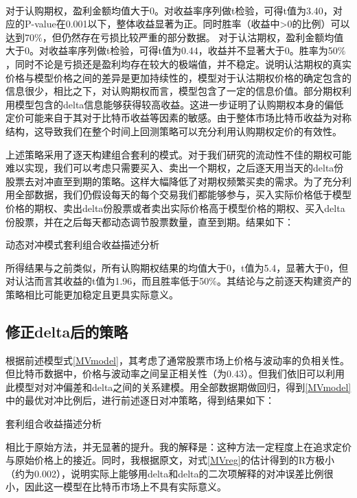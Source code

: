 ~\\ 
对于认购期权，盈利金额均值大于0。对收益率序列做t检验，可得t值为3.40，对应的P-value在0.001以下，整体收益显著为正。同时胜率（收益中>0的比例）可以达到70$\%$，但仍然存在亏损比较严重的部分数据。
对于认沽期权，盈利金额均值大于0。对收益率序列做t检验，可得t值为0.44，收益并不显著大于0。胜率为50$\%$，同时不论是亏损还是盈利均存在较大的极端值，并不稳定。说明认沽期权的真实价格与模型价格之间的差异是更加持续性的，模型对于认沽期权价格的确定包含的信息很少，相比之下，对认购期权而言，模型包含了一定的信息价值。部分期权利用模型包含的delta信息能够获得较高收益。这进一步证明了认购期权本身的偏低定价可能来自于其对于比特币收益等因素的敏感。由于整体市场比特币收益为对称结构，这导致我们在整个时间上回测策略可以充分利用认购期权定价的有效性。
\par{上述策略采用了逐天构建组合套利的模式。对于我们研究的流动性不佳的期权可能难以实现，我们可以考虑只需要买入、卖出一个期权，之后逐天用当天的delta份股票去对冲直至到期的策略。这样大幅降低了对期权频繁买卖的需求。为了充分利用全部数据，我们仍假设每天的每个交易我们都能够参与，买入实际价格低于模型价格的期权、卖出delta份股票或者卖出实际价格高于模型价格的期权、买入delta份股票，并在之后每天都动态调节股票数量，直至到期。结果如下：
}
\begin{table}[H]
    \caption{动态对冲模式套利组合收益描述分析}
    \centering
    

\end{table}
所得结果与之前类似，所有认购期权结果的均值大于0，t值为5.4，显著大于0，但对认沽而言其收益的t值为1.96，而且胜率低于50$\%$。其结论与之前逐天构建资产的策略相比可能更加稳定且更具实际意义。
\subsection{修正delta后的策略}
根据前述模型式\ref{MVmodel}，其考虑了通常股票市场上价格与波动率的负相关性。但比特币数据中，价格与波动率之间呈正相关性（为0.43）。但我们依旧可以利用此模型对对冲偏差和delta之间的关系建模。用全部数据期做回归，得到\ref{MVmodel}中的最优对冲比例后，进行前述逐日对冲策略，得到结果如下：
\begin{table}[H]
    \caption{套利组合收益描述分析}
    \centering
    
    
\end{table}
相比于原始方法，并无显著的提升。我的解释是：这种方法一定程度上在追求定价与原始价格上的接近。同时，我根据原文，对式\ref{MVreg}的估计得到的R方极小（约为0.002），说明实际上能够用delta和delta的二次项解释的对冲误差比例很小，因此这一模型在比特币市场上不具有实际意义。